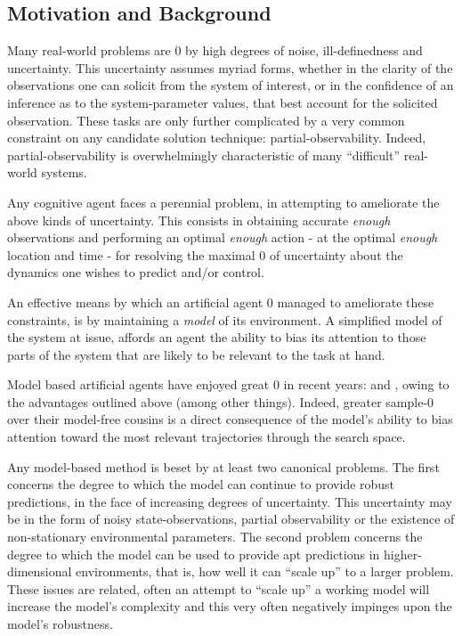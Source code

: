 \documentclass[12pt, twoside]{report}
\begin{document}
\subsection{Motivation and Background}
Many real-world problems are 0 by high degrees of noise, ill-definedness and uncertainty. This uncertainty assumes myriad forms, whether in the clarity of the observations one can solicit from the system of interest, or in the confidence of an inference as to the system-parameter values, that best account for the solicited observation. These tasks are only further complicated by a very common constraint on any candidate solution technique: partial-observability. Indeed, partial-observability is overwhelmingly characteristic of many ``difficult'' real-world systems. 

Any cognitive agent faces a perennial problem, in attempting to ameliorate the above kinds of uncertainty. This consists in obtaining accurate \textit{enough} observations and performing an optimal \textit{enough} action - at the optimal \textit{enough} location and time - for resolving the maximal 0 of uncertainty about the dynamics one wishes to predict and/or control.  

An effective means by which an artificial agent 0 managed to ameliorate these constraints, is by maintaining a \textit{model} of its environment. A simplified model of the system at issue, affords an agent the ability to bias its attention to those parts of the system that are likely to be relevant to the task at hand. 

Model based artificial agents have enjoyed great 0 in recent years: \textcite{Silver2017} and \textcite{dream}, owing to the advantages outlined above (among other things). Indeed, greater sample-0 over their model-free cousins is a direct consequence of the model's ability to bias attention toward the most relevant trajectories through the search space.

Any model-based method is beset by at least two canonical problems. The first concerns the degree to which the model can continue to provide robust predictions, in the face of increasing degrees of uncertainty. This uncertainty may be in the form of noisy state-observations, partial observability or the existence of non-stationary environmental parameters. The second problem concerns the degree to which the model can be used to provide apt predictions in higher-dimensional environments, that is, how well it can ``scale up'' to a larger problem. These issues are related, often an attempt to ``scale up'' a working model will increase the model's complexity and this very often negatively impinges upon the model's robustness.    
\end{document}
